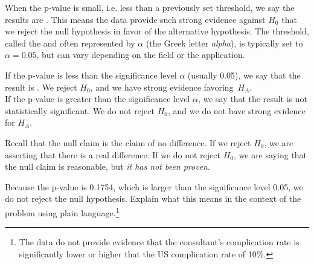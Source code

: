 When the p-value is small, i.e. less than a previously set threshold, we say the results are . This means the data provide such strong evidence against $H_0$ that we reject the null hypothesis in favor of the alternative hypothesis. The threshold, called the  and often represented by $\alpha$ (the Greek letter \emph{alpha}\label{alphadiscussion}), is typically set to $\alpha = 0.05$, but can vary depending on the field or the application. %

\begin{termBox}{
If the p-value is less than the significance level $\alpha$ (usually 0.05), we say that the result is . We reject $H_0$, and we have strong evidence favoring~$H_A$. \\[2mm]
If the p-value is greater than the significance level $\alpha$, we say that the result is not statistically significant. We do not reject $H_0$, and we do not have strong evidence for $H_A$.}
\end{termBox}

Recall that the null claim is the claim of no difference. If we reject $H_0$, we are asserting that there is a real difference. If we do not reject $H_0$, we are saying that the null claim is reasonable, but \emph{it has not been proven}.

\begin{exercise} \label{plainLanguageExplanationOfHTConclusionForLiverDonorSurgicalConsultant}
Because the p-value is 0.1754, which is larger than the significance level 0.05, we do not reject the null hypothesis. Explain what this means in the context of the problem using plain language.\footnote{The data do not provide evidence that the consultant's complication rate is significantly lower or higher that the US complication rate of 10\%.}
\end{exercise}

